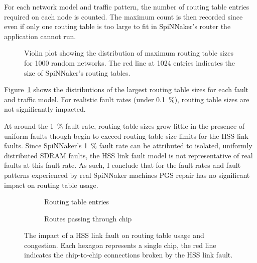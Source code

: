 			For each network model and traffic pattern, the number of routing table
			entries required on each node is counted. The maximum count is then
			recorded since even if only one routing table is too large to fit in
			SpiNNaker's router the application cannot run.
			
			\begin{figure}
				\center
				
				\caption[Routing table sizes for \num{1000} random networks.]%
				{Violin plot showing the distribution of maximum routing table
				sizes for \num{1000} random networks. The red line at \num{1024}
				entries indicates the size of SpiNNaker's routing tables.}
				\label{fig:routing-entries}
			\end{figure}
			
			Figure~\ref{fig:routing-entries} shows the distributions of the largest
			routing table sizes for each fault and traffic model. For realistic fault
			rates (under \SI{0.1}{\percent}), routing table sizes are not
			significantly impacted.
			
			At around the \SI{1}{\percent} fault rate, routing table sizes grow
			little in the presence of uniform faults though begin to exceed routing
			table size limits for the HSS link faults. Since SpiNNaker's
			\SI{1}{\percent} fault rate can be attributed to isolated, uniformly
			distributed SDRAM faults, the HSS link fault model is not representative
			of real faults at this fault rate. As such, I conclude that for the fault
			rates and fault patterns experienced by real SpiNNaker machines PGS
			repair has no significant impact on routing table usage.
			
			\begin{figure}
				\center
				\begin{subfigure}{0.48\linewidth}
					\center
					
					\caption{Routing table entries}
					\label{fig:hss-link-routing-table-usage}
				\end{subfigure}
				\begin{subfigure}{0.48\linewidth}
					\center
					
					\caption{Routes passing through chip}
					\label{fig:hss-link-resource-usage}
				\end{subfigure}
				
				\caption[The impact of a HSS link fault.]%
				{The impact of a HSS link fault on routing table usage and
				congestion. Each hexagon represents a single chip, the red line
				indicates the chip-to-chip connections broken by the HSS link fault.}
				\label{fig:hss-link-usage}
			\end{figure}
			
